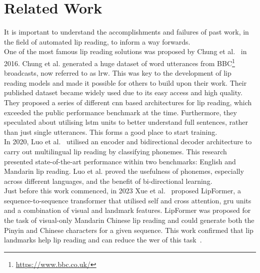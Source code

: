 \section{Related Work}
It is important to understand the accomplishments and failures of past work, in the field of automated lip reading, to inform a way forwards.\\
One of the most famous lip reading solutions was proposed by Chung et al.~\cite{Lip-Reading-In-The-Wild} in 2016. Chung et al. generated a huge dataset of word utterances from BBC\footnote{\url{https://www.bbc.co.uk/}} broadcasts, now referred to as \gls{lrw}. This was key to the development of lip reading models and made it possible for others to build upon their work. Their published dataset became widely used due to its easy access and high quality.\\
They proposed a series of different \acrshort{cnn} based architectures for lip reading, which exceeded the public performance benchmark at the time. Furthermore, they speculated about utilising \acrshort{lstm} units to better understand full sentences, rather than just single utterances. This forms a good place to start training.\\
In 2020, Luo et al.~\cite{Synchronous-Bidirectional-Learning-for-Multilingual-Lip-Reading} utilised an encoder and bidirectional decoder architecture to carry out multilingual lip reading by classifying phonemes. This research presented state-of-the-art performance within two benchmarks: English and Mandarin lip reading. Luo et al. proved the usefulness of phonemes, especially across different languages, and the benefit of bi-directional learning.\\  
Just before this work commenced, in 2023 Xue et al.~\cite{lipreading_with_attention} proposed LipFormer, a sequence-to-sequence \gls{transformer} that utilised self and cross attention, \acrshort{gru} units and a combination of visual and landmark features. LipFormer was proposed for the task of visual-only Mandarin Chinese lip reading and could generate both the Pinyin and Chinese characters for a given sequence. This work confirmed that lip landmarks help lip reading and can reduce the \acrfull{wer} of this task~\cite{lipreading_with_attention}.